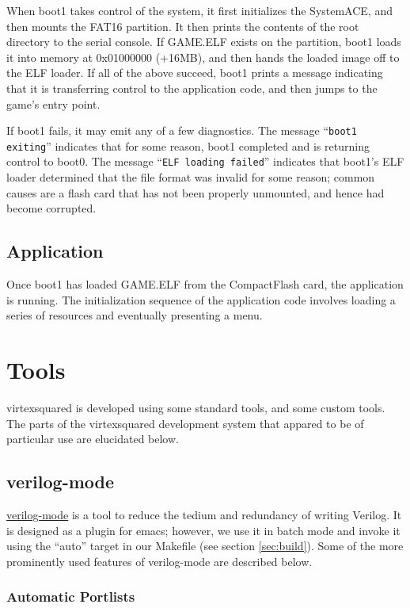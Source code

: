 \documentclass[10pt]{report}
\begin{document}
When boot1 takes control of the system, it first initializes the SystemACE,
and then mounts the FAT16 partition. It then prints the contents of the root
directory to the serial console. If GAME.ELF exists on the partition, boot1
loads it into memory at 0x01000000 (+16MB), and then hands the loaded image
off to the ELF loader. If all of the above succeed, boot1 prints a message
indicating that it is transferring control to the application code, and then
jumps to the game's entry point.

If boot1 fails, it may emit any of a few diagnostics. The message
``\texttt{boot1 exiting}'' indicates that for some reason, boot1 completed
and is returning control to boot0.  The message ``\texttt{ELF loading
failed}'' indicates that boot1's ELF loader determined that the file format
was invalid for some reason; common causes are a flash card that has not
been properly unmounted, and hence had become corrupted.

\subsection{Application}

Once boot1 has loaded GAME.ELF from the CompactFlash card, the application
is running. The initialization sequence of the application code involves
loading a series of resources and eventually presenting a menu.

\section{Tools}

virtexsquared is developed using some standard tools, and some custom tools. 
The parts of the virtexsquared development system that appared to be of
particular use are elucidated below.

\subsection{verilog-mode}

\href{http://www.veripool.org/wiki/verilog-mode}{verilog-mode} is a tool to
reduce the tedium and redundancy of writing Verilog.  It is designed as a
plugin for emacs; however, we use it in batch mode and invoke it using the
``auto'' target in our Makefile (see section \ref{sec:build}).  Some of the
more prominently used features of verilog-mode are described below.

\subsubsection{Automatic Portlists}
\end{document}
